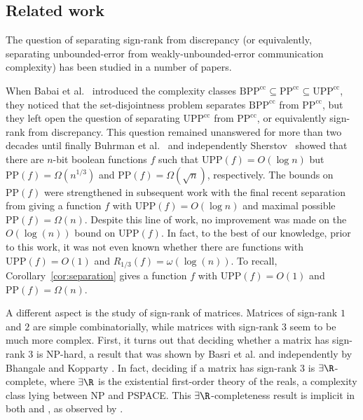\documentclass{toc}
\newcommand{\BPP}{\mathrm{BPP}}
\newcommand{\UPP}{\mathrm{UPP}}
\newcommand{\calPP}{\mathrm{PP}}
\newcommand{\cc}{\mathrm{cc}}
\begin{document}
%



%
%
%
%
%
%
%
%

%
%
%
%

%
%
%
%






\subsection{Related work}

The question of separating sign-rank from discrepancy (or equivalently, separating unbounded-error from weakly-unbounded-error communication complexity) has been studied in a number of papers.

When  Babai {et al.}~\cite{babai1986complexity} introduced the complexity classes $\BPP^\cc \subseteq \calPP^\cc \subseteq \UPP^\cc$, they noticed that the   set-disjointness problem separates  $\BPP^\cc$ from $\calPP^\cc$, but they left open the question of separating  $\UPP^\cc$ from $\calPP^\cc$, or equivalently sign-rank from discrepancy. This question  remained unanswered for more than two decades until finally  Buhrman {et al.}~\cite{buhrman2007computation} and independently Sherstov~\cite{sherstov2008halfspace} showed that there are  $n$-bit boolean %
functions  %
$f$ such that $\UPP(f) = O(\log n)$ but $\calPP(f) = \Omega(n^{1/3})$ and $\calPP(f)= \Omega(\sqrt{n})$, respectively. The bounds on $\calPP(f)$  were strengthened in subsequent %
work \cite{sherstov2011pattern,sherstov2013optimal,thaler2016lower,hardestSher}   %
with the final recent separation from \cite{hardestSher} giving a function $f$ with $\UPP(f) = O(\log n)$ and maximal possible $\calPP(f)= \Omega(n)$.  Despite this line of work,  no improvement was made on the $O(\log(n))$ bound on  $\UPP(f)$. In fact, to the best of our knowledge, prior to this work,  it was not even known whether there are functions with $\UPP(f)=O(1)$ and $R_{1/3}(f)=\omega(\log(n))$. To recall, Corollary~\ref{cor:separation} gives a function $f$ with $\UPP(f) = O(1)$ and $\calPP(f)= \Omega(n)$.

A different aspect is the study of sign-rank of matrices. Matrices of sign-rank $1$ and $2$ are simple combinatorially, while matrices with sign-rank $3$ seem to be much more complex. First, it turns out that deciding whether a matrix has sign-rank $3$ is NP-hard, a result that was shown by Basri {et al.} \cite{basri2009visibility} and independently by Bhangale and Kopparty \cite{bhangale2015complexity}. In fact, deciding if a matrix has sign-rank 3 is $\exists \R$-complete, where $\exists \R$ is the existential first-order theory of the reals, a complexity class lying  between NP and PSPACE. This $\exists \R$-completeness result is implicit in both \cite{basri2009visibility} and \cite{bhangale2015complexity}, as observed by \cite{alon2016sign}.
\end{document}
